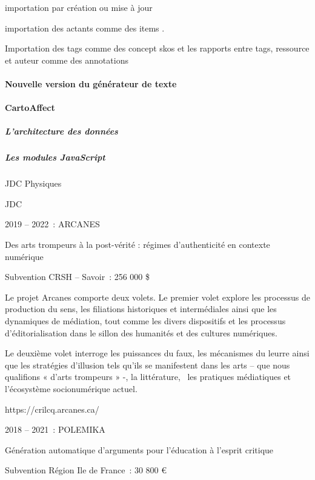 \documentclass[
  letterpaper,
  DIV=11,
  numbers=noendperiod]{scrreprt}
\let\oldparagraph\paragraph
\renewcommand{\paragraph}[1]{\oldparagraph{#1}\mbox{}}
\let\oldsubparagraph\subparagraph
\renewcommand{\subparagraph}[1]{\oldsubparagraph{#1}\mbox{}}
\begin{document}
importation par création ou mise à jour

importation des actants comme des items .

Importation des tags comme des concept skos et les rapports entre tags,
ressource et auteur comme des annotations

\hypertarget{nouvelle-version-du-guxe9nuxe9rateur-de-texte}{%
\paragraph{Nouvelle version du générateur de
texte}\label{nouvelle-version-du-guxe9nuxe9rateur-de-texte}}

\hypertarget{sec-cartoAffect}{%
\paragraph{CartoAffect}\label{sec-cartoAffect}}

\hypertarget{larchitecture-des-donnuxe9es}{%
\subparagraph{L'architecture des
données}\label{larchitecture-des-donnuxe9es}}

\hypertarget{les-modules-javascript}{%
\subparagraph{Les modules JavaScript}\label{les-modules-javascript}}

JDC Physiques

JDC

2019 -- 2022~: ARCANES

Des arts trompeurs à la post-vérité : régimes d'authenticité en contexte
numérique

Subvention CRSH -- Savoir~: 256 000 \$

Le projet Arcanes comporte deux volets. Le premier volet explore les
processus de production du sens, les filiations historiques et
intermédiales ainsi que les dynamiques de médiation, tout comme les
divers dispositifs et les processus d'éditorialisation dans le sillon
des humanités et des cultures numériques.

Le deuxième volet interroge les puissances du faux, les mécanismes du
leurre ainsi que les stratégies d'illusion tels qu'ils se manifestent
dans les arts -- que nous qualifions « d'arts trompeurs » -, la
littérature,~ les pratiques médiatiques et l'écosystème socionumérique
actuel.

https://crilcq.arcanes.ca/~

2018 -- 2021~: POLEMIKA

Génération automatique d'arguments pour l'éducation à l'esprit critique

Subvention Région Ile de France~: 30 800 €~
\end{document}
